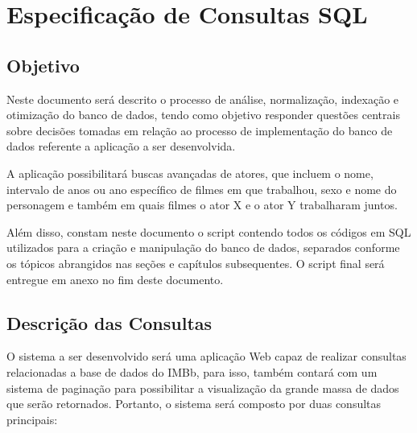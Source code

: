 \documentclass[
	12pt,				%
	oneside,			%
	a4paper,			%
	brazil				%
	]{abntex2}
\begin{document}





\tableofcontents*
\cleardoublepage



\textual





\chapter{Especificação de Consultas SQL}
\section{Objetivo}
	Neste documento será descrito o processo de análise, normalização, indexação e otimização do banco de dados, tendo como objetivo responder questões centrais sobre decisões tomadas em relação ao processo de implementação do banco de dados referente a aplicação a ser desenvolvida.
    
    
   A aplicação possibilitará buscas avançadas de atores, que incluem o nome, intervalo de anos ou ano específico de filmes em que trabalhou, sexo e nome do personagem e também em quais filmes o ator X e o ator Y trabalharam juntos. 
   
   
   Além disso, constam neste documento o script contendo todos os códigos em SQL utilizados para a criação e manipulação do banco de dados, separados conforme os tópicos abrangidos nas seções e capítulos subsequentes. O script final será entregue em anexo no fim deste documento.
   
\section{Descrição das Consultas}
O sistema a ser desenvolvido será uma aplicação Web capaz de realizar consultas relacionadas a base de dados do IMBb, para isso, também contará com um sistema de paginação para possibilitar a visualização da grande massa de dados que serão retornados. Portanto, o sistema será composto por duas consultas principais:
 
\end{document}
